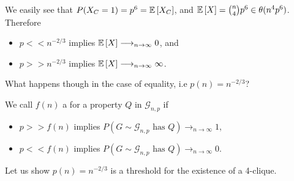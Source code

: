 We easily see that $P(X_C = 1) = p^6 = \mathbb{E}\left[X_C\right]$, and
$\mathbb{E}\left[X\right] = \binom{n}{4} p^6 \in \theta (n^4p^6)$.
Therefore
\begin{itemize}
    \item $p << n^{-2/3}$ implies $\mathbb{E}\left[X\right] \longrightarrow_{n \rightarrow \infty} 0$, and
    \item $p >> n^{-2/3}$ implies $\mathbb{E}\left[X\right] \longrightarrow_{n \rightarrow \infty} \infty$.
\end{itemize}
What happens though in the case of equality, i.e $p(n) = n^{-2/3}$?

\begin{definition}
    We call $f(n)$ a  for a property $Q$ in $\mathcal{G}_{n,p}$ if
    \begin{itemize}
        \item $p >> f(n)$ implies $P(G \sim \mathcal G_{n,p} \text{ has } Q) \longrightarrow_{n \rightarrow \infty} 1$,
        \item $p << f(n)$ implies $P(G \sim \mathcal G_{n,p} \text{ has } Q) \longrightarrow_{n \rightarrow \infty} 0$.
    \end{itemize}
\end{definition}
Let us show $p(n) = n^{-2/3}$ is a threshold for the existence of a 4-clique.
